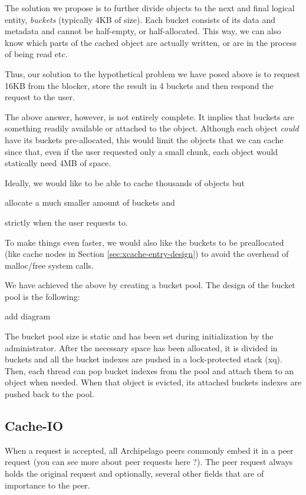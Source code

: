 The solution we propose is to further divide objects to the next and final 
logical entity, \emph{buckets} (typically 4KB of size). Each bucket consists of 
its data and metadata and cannot be half-empty, or half-allocated. This way, we 
can also know which parts of the cached object are actually written, or are in 
the process of being read etc.

Thus, our solution to the hypothetical problem we have posed above is to 
request 16KB from the blocker, store the result in 4 buckets and then respond 
the request to the user.

The above answer, however, is not entirely complete. It implies that buckets 
are something readily available or attached to the object. Although each object 
\textit{could} have its buckets pre-allocated, this would limit the objects 
that we can cache since that, even if the user requested only a small chunk, 
each object would statically need 4MB of space.

Ideally, we would like to be able to cache thousands of objects but
\begin{inparaenum}[i)]
\item allocate a much smaller amount of buckets and
\item strictly when the user requests to.
\end{inparaenum}
To make things even faster, we would also like the buckets to be preallocated 
(like cache nodes in Section \ref{sec:xcache-entry-design}) to avoid the 
overhead of malloc/free system calls.

We have achieved the above by creating a bucket pool. The design of the bucket 
pool is the following:

\fixme add diagram

The bucket pool size is static and has been set during initialization by the 
administrator. After the necessary space has been allocated, it is divided in 
buckets and all the bucket indexes are pushed in a lock-protected stack (xq).  
Then, each thread can pop bucket indexes from the pool and attach them
to an object when needed. When that object is evicted, its attached buckets 
indexes are pushed back to the pool.

\subsection{Cache-IO}

When a request is accepted, all Archipelago peers commonly embed it in a peer 
request (you can see more about peer requests here ?). The peer request always 
holds the original request and optionally, several other fields that are of 
importance to the peer.

